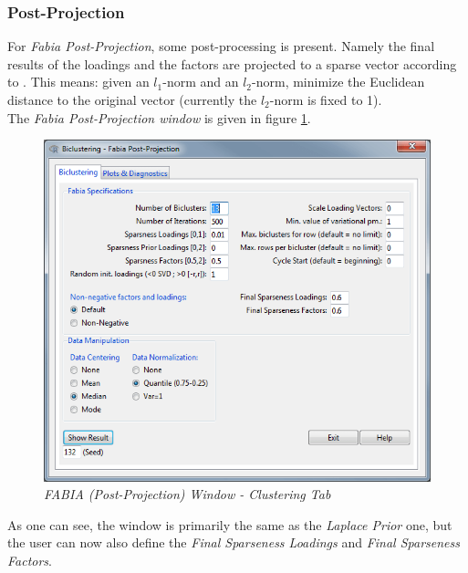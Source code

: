 \documentclass[a4paper]{article}\usepackage[]{graphicx}\usepackage[]{color}
\begin{document}
\subsubsection{Post-Projection}
For {\it Fabia Post-Projection}, some post-processing is present. Namely
the final results of the loadings and the factors are projected to a sparse
vector according to \citet{Hoyer2004}. This means: given an $l_1$-norm and an
$l_2$-norm, minimize the Euclidean distance to the original
vector (currently the $l_2$-norm is fixed to 1).\\
The {\it Fabia Post-Projection window} is given in figure
\ref{fabiapostproj_clusttab}.
\begin{figure}[H]
\centering
\includegraphics[scale=0.5]{figures/fabiapostproj_clusttab.png}
\caption{{\it FABIA (Post-Projection) Window - Clustering
Tab}\label{fabiapostproj_clusttab}}
\end{figure}
\noindent As one can see, the window is primarily the same as the {\it Laplace
Prior} one, but the user can now also define the {\it Final Sparseness
Loadings} and {\it Final Sparseness Factors}.
\end{document}
